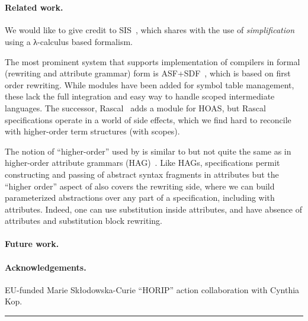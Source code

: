 \documentclass[letterpaper,11pt]{article}
\begin{document}
~\cite{Knuth:mst1968} 
~\cite{Aho+:2006}


\paragraph*{Related work.}

We would like to give credit to SIS~\cite{Mosses:daimi1979}, which shares with \hax the use of
\emph{simplification} using a λ-calculus based formalism.

The most prominent system that supports implementation of compilers in formal (rewriting and
attribute grammar) form is ASF+SDF~\cite{Brand+:toplas2002}, which is based on first order
rewriting. While modules have been added for symbol table management, these lack the full
integration and easy way to handle scoped intermediate languages. The successor,
Rascal~\cite{Bos+:eptcs2011} adds a module for HOAS, but Rascal specifications operate in a world of
side effects, which we find hard to reconcile with higher-order term structures (with scopes).

The notion of ``higher-order'' used by \hax is similar to but not quite the same as in higher-order
attribute grammars (HAG)~\cite{VogtSwierstraKuiper:pldi1989}. Like HAGs, \hax specifications permit
constructing and passing of abstract syntax fragments in attributes but the ``higher order'' aspect
of \hax also covers the rewriting side, where we can build parameterized abstractions over any part
of a specification, including with attributes. Indeed, one can use substitution inside attributes,
and have absence of attributes and substitution block rewriting.

\paragraph*{Future work.} 


\paragraph*{Acknowledgements.} 

EU-funded Marie Skłodowska-Curie ``HORIP'' action collaboration with Cynthia Kop.






\hrule
\vspace*{1pc}
\end{document}
